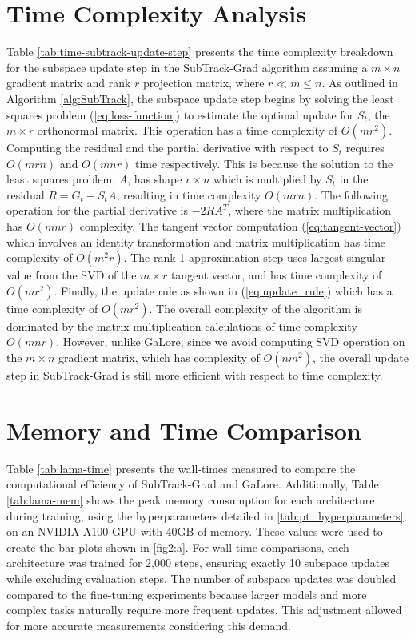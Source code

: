 


\section{Time Complexity Analysis}
\label{appendix:time-complexity}

Table \ref{tab:time-subtrack-update-step} presents the time complexity breakdown for the subspace update step in the SubTrack-Grad algorithm assuming a $m \times n$ gradient matrix and rank $r$ projection matrix, where $r \ll m \leq n$. As outlined in Algorithm \ref{alg:SubTrack}, the subspace update step begins by solving the least squares problem (\ref{eq:loss-function}) to estimate the optimal update for $S_t$, the $m \times r$ orthonormal matrix. This operation has a time complexity of $O(mr^2)$. Computing the residual and the partial derivative with respect to $S_t$ requires $O(mrn)$ and $O(mnr)$ time respectively. This is because the solution to the least squares problem, $A$, has shape $ r \times n$ which is multiplied by $S_t$ in the residual $R=G_t - S_tA$, resulting in time complexity $O(mrn)$. The following operation for the partial derivative is $-2RA^T$, where the matrix multiplication has $O(mnr)$ complexity. The tangent vector computation (\ref{eq:tangent-vector}) which involves an identity transformation and matrix multiplication has time complexity of $O(m^2r)$.  The rank-1 approximation step uses largest singular value from the SVD of the $ m \times r$ tangent vector, and has time complexity of $O(mr^2)$. Finally, the update rule as shown in  (\ref{eq:update_rule}) which has a time complexity of $O(mr^2)$. The overall complexity of the algorithm is dominated by the matrix multiplication calculations of time complexity $O(mnr)$. However, unlike GaLore, since we avoid computing SVD operation on the $m \times n$ gradient matrix, which has complexity of $O(nm^2)$, the overall update step in SubTrack-Grad is still more efficient with respect to time complexity. 



\section{Memory and Time Comparison}
\label{appendix:mem-time}
Table \ref{tab:lama-time} presents the wall-times measured to compare the computational efficiency of SubTrack-Grad and GaLore. Additionally, Table \ref{tab:lama-mem} shows the peak memory consumption for each architecture during training, using the hyperparameters detailed in \ref{tab:pt_hyperparameters}, on an NVIDIA A100 GPU with 40GB of memory. These values were used to create the bar plots shown in \ref{fig2:a}.
For wall-time comparisons, each architecture was trained for 2,000 steps, ensuring exactly 10 subspace updates while excluding evaluation steps. The number of subspace updates was doubled compared to the fine-tuning experiments because larger models and more complex tasks naturally require more frequent updates. This adjustment allowed for more accurate measurements considering this demand. 



